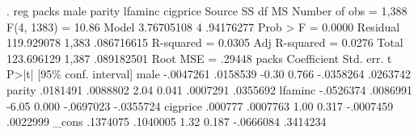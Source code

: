 . reg packs male parity lfaminc cigprice
{\smallskip}
      Source {\VBAR}       SS           df       MS      Number of obs   =     1,388
   F(4, 1383)      =     10.86
       Model {\VBAR}  3.76705108         4   .94176277   Prob > F        =    0.0000
    Residual {\VBAR}  119.929078     1,383  .086716615   R-squared       =    0.0305
   Adj R-squared   =    0.0276
       Total {\VBAR}  123.696129     1,387  .089182501   Root MSE        =    .29448
{\smallskip}
       packs {\VBAR} Coefficient  Std. err.      t    P>|t|     [95\% conf. interval]
        male {\VBAR}  -.0047261   .0158539    -0.30   0.766    -.0358264    .0263742
      parity {\VBAR}   .0181491   .0088802     2.04   0.041     .0007291    .0355692
     lfaminc {\VBAR}  -.0526374   .0086991    -6.05   0.000    -.0697023   -.0355724
    cigprice {\VBAR}    .000777   .0007763     1.00   0.317    -.0007459    .0022999
       _cons {\VBAR}   .1374075   .1040005     1.32   0.187    -.0666084    .3414234
{\smallskip}
